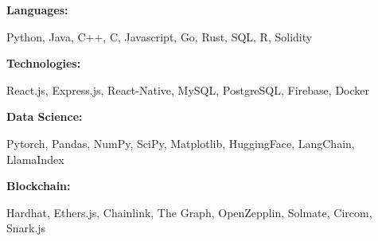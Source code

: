 \documentclass[9pt]{developercv} %
\begin{document}
\vspace{-6pt}
\begin{minipage}[t]{\linewidth}
    \vspace{-6pt}

    \hspace*{50pt}
    \begin{minipage}[t]{0.14\textwidth}
        \textbf{Languages:} 
    \end{minipage}
    \hfill
    \begin{minipage}[t]{\textwidth}
      Python, Java, C++, C, Javascript, Go, Rust, SQL, R, Solidity
    \end{minipage}
    \vspace{0.5mm}

    \hspace*{50pt}
    \begin{minipage}[t]{0.14\textwidth}
        \textbf{Technologies:}
    \end{minipage}
    \hfill
    \begin{minipage}[t]{\textwidth}
      React.js, Express.js, React-Native, MySQL, PostgreSQL, Firebase, Docker
    \end{minipage}
    \vspace{0.5mm}

    \hspace*{50pt}
    \begin{minipage}[t]{0.14\textwidth}
        \textbf{Data Science:}
    \end{minipage}
    \hfill
    \begin{minipage}[t]{\textwidth}
    Pytorch, Pandas, NumPy, SciPy, Matplotlib, HuggingFace, LangChain, LlamaIndex
    \end{minipage}
    \vspace{0.5mm}

    \hspace*{50pt}
    \begin{minipage}[t]{0.14\textwidth}
    \textbf{Blockchain:}
    \end{minipage}
    \hfill
    \begin{minipage}[t]{\textwidth}
      Hardhat, Ethers.js, Chainlink, The Graph, OpenZepplin, Solmate, Circom, Snark.js
    \end{minipage}
    \vspace{0.5mm}
    
\end{minipage}
\end{document}
